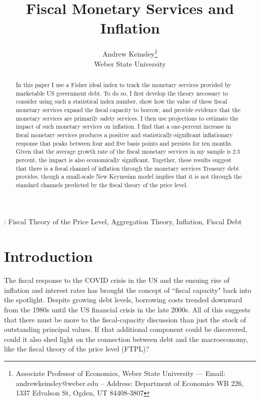 \documentclass[11pt,a4paper,margin=1.5in]{article}
\title{Fiscal Monetary Services and Inflation}
\author{Andrew Keinsley\thanks{Associate Professor of Economics, Weber State University --- Email: andrewkeinsley@weber.edu -- Address: Department of Economics WB 226, 1337 Edvalson St, Ogden, UT 84408-3807 } \\  {\small Weber State University}}
\begin{document}
\maketitle
\thispagestyle{empty}

\begin{abstract}
\noindent In this paper I use a Fisher ideal index to track the monetary services provided by marketable US government debt.
To do so, I first develop the theory necessary to consider using such a statistical index number, show how the value of these fiscal monetary services expand the fiscal capacity to borrow, and provide evidence that the monetary services are primarily safety services.
I then use \citet{Jorda:2005} projections to estimate the impact of such monetary services on inflation.
I find that a one-percent increase in fiscal monetary services produces a positive and statistically-significant inflationary response that peaks between four and five basis points and persists for ten months. 
Given that the average growth rate of the fiscal monetary services in my sample is 2.5 percent, the impact is also economically significant.
Together, these results suggest that there is a fiscal channel of inflation through the monetary services Treasury debt provides, though a small-scale New Keynesian model implies that it is not through the standard channels predicted by the fiscal theory of the price level.

\end{abstract}
\vspace{2em}

: Fiscal Theory of the Price Level, Aggregation Theory, Inflation, Fiscal Debt
\newpage
\setcounter{page}{1}


\section{Introduction}

The fiscal response to the COVID crisis in the US and the ensuing rise of inflation and interest rates has brought the concept of ``fiscal capacity" back into the spotlight. 
Despite growing debt levels, borrowing costs trended downward from the 1980s until the US financial crisis in the late 2000s.
All of this suggests that there must be more to the fiscal-capacity discussion than just the stock of outstanding principal values.
If that additional component could be discovered, could it also shed light on the connection between debt and the macroeconomy, like the fiscal theory of the price level (FTPL)?
\end{document}
